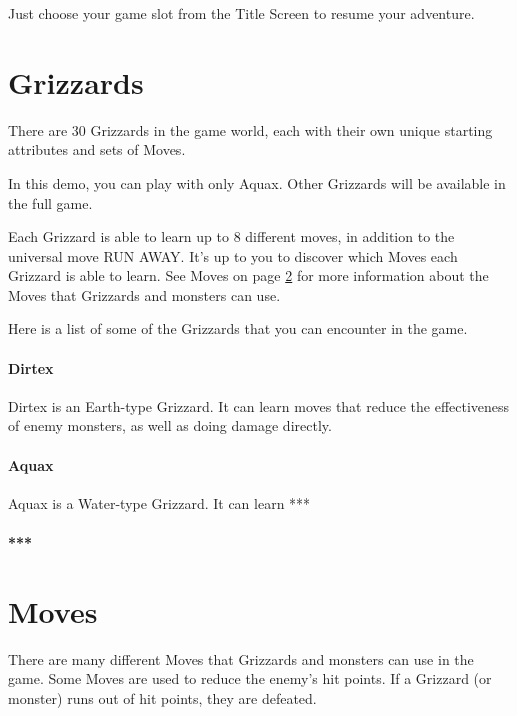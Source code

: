 \documentclass[12pt,twoside,openright,book]{memoir}
\begin{document}
\begin{description}
Just  choose   your  game   slot  from  the   Title  Screen   to  resume
your adventure.

\chapter{Grizzards}

There are  30 Grizzards in  the game world,  each with their  own unique
starting attributes and sets of Moves.

\ifdef\DEMO

In this  demo, you  can play  with only Aquax.  Other Grizzards  will be
available in the full game.

\fi

Each Grizzard is able  to learn up to 8 different  moves, in addition to
the universal move RUN AWAY. It's up to you to discover which Moves each
Grizzard  is able  to  learn. See  Moves on  page  \ref{Moves} for  more
information about the Moves that Grizzards and monsters can use.

Here  is a  list of  some of  the Grizzards  that you  can encounter  in
the game.

\subsubsection{Dirtex}

Dirtex is  an Earth-type Grizzard.  It can  learn moves that  reduce the
effectiveness of enemy monsters, as well as doing damage directly.

\subsubsection{Aquax}

Aquax is a Water-type Grizzard. It can learn ***

\subsubsection{***}

\chapter{Moves}\label{Moves}

There are  many different Moves that  Grizzards and monsters can  use in
the  game.  Some Moves  are  used  to  reduce  the enemy's  hit  points.
If a Grizzard (or monster) runs out of hit points, they are defeated.


\end{description}
\end{document}
